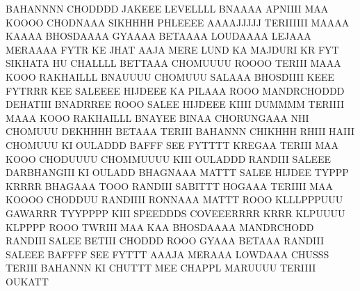 BAHANNNN CHODDDD JAKEEE LEVELLLL BNAAAA APNIIII MAA KOOOO CHODNAAA SIKHHHH PHLEEEE
AAAAJJJJJ TERIIIIII MAAAA KAAAA BHOSDAAAA GYAAAA BETAAAA LOUDAAAA LEJAAA MERAAAA
FYTR KE JHAT AAJA MERE LUND KA MAJDURI KR FYT SIKHATA HU
CHALLLL BETTAAA CHOMUUUU ROOOO
TERIII MAAA KOOO RAKHAILLL BNAUUUU CHOMUUU SALAAA
BHOSDIIII KEEE FYTRRR KEE SALEEEE
HIJDEEE KA PILAAA ROOO MANDRCHODDD
DEHATIII BNADRREE ROOO SALEE HIJDEEE KIIII DUMMMM
TERIIII MAAA KOOO RAKHAILLL BNAYEE BINAA CHORUNGAAA NHI CHOMUUU
DEKHHHH BETAAA TERIII BAHANNN CHIKHHH RHIII HAIII CHOMUUU KI OULADDD
BAFFF SEE FYTTTT KREGAA TERIII MAA KOOO CHODUUUU CHOMMUUUU KIII OULADDD
RANDIII SALEEE DARBHANGIII KI OULADD
BHAGNAAA MATTT SALEE HIJDEE TYPPP KRRRR
BHAGAAA TOOO RANDIII SABITTT HOGAAA TERIIII MAA KOOOO CHODDUU
RANDIIII RONNAAA MATTT ROOO KLLLPPPUUU GAWARRR
TYYPPPP KIII SPEEDDDS COVEEERRRR KRRR
KLPUUUU KLPPPP ROOO TWRIII MAA KAA BHOSDAAAA
MANDRCHODD
RANDIII SALEE BETIII CHODDD
ROOO GYAAA BETAAA
RANDIII SALEEE BAFFFF SEE FYTTT
AAAJA MERAAA LOWDAAA CHUSSS
TERIII BAHANNN KI CHUTTT MEE CHAPPL MARUUUU
TERIIII OUKATT
